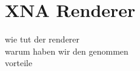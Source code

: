 \chapter{XNA Renderer}
\begin{Spacing}{\mylinespace}

wie tut der renderer \\
warum haben wir den genommen\\
vorteile\\


\end{Spacing}
\newpage
\clearpage
